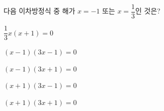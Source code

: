 다음 이차방정식 중 해가 $x=-1$ 또는 $x=\dfrac{1}{3}$인 것은?
\begin{choicesii}{\rule[-3ex]{0pt}{8ex}$\dfrac{1}{3}x(x+1)=0$}{\rule[-3ex]{0pt}{8ex}$(x-1)(3x-1)=0$}{\rule[-3ex]{0pt}{8ex}$(x-1)(3x+1)=0$}{\rule[-3ex]{0pt}{8ex}$(x+1)(3x-1)=0$}{\rule[-3ex]{0pt}{8ex}$(x+1)(3x+1)=0$}\end{choicesii}
